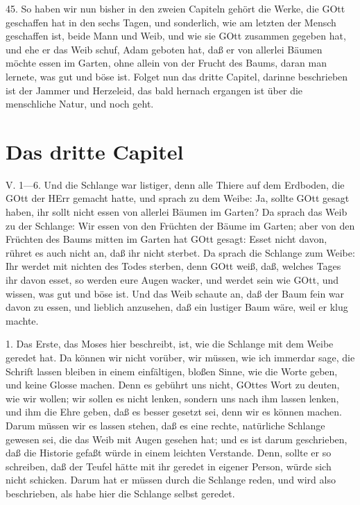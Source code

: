 45. So haben wir nun bisher in den zweien Capiteln gehört die Werke, die GOtt geschaffen hat in den sechs Tagen, und sonderlich, wie am letzten der Mensch geschaffen ist, beide Mann und Weib, und wie sie GOtt zusammen gegeben hat, und ehe er das Weib schuf, Adam geboten hat, daß er von allerlei Bäumen möchte essen im Garten, ohne allein von der Frucht des Baums, daran man lernete, was gut und böse ist. Folget nun das dritte Capitel, darinne beschrieben ist der Jammer und Herzeleid, das bald hernach ergangen ist über die menschliche Natur, und noch geht.

\section{Das dritte Capitel}

\begin{schriftzitat}
V. 1—6. Und die Schlange war listiger, denn alle Thiere auf dem Erdboden, die GOtt der HErr gemacht hatte, und sprach zu dem Weibe: Ja, sollte GOtt gesagt haben, ihr sollt nicht essen von allerlei Bäumen im Garten? Da sprach das Weib zu der Schlange: Wir essen von den Früchten der Bäume im Garten; aber von den Früchten des Baums mitten im Garten hat GOtt gesagt: Esset nicht davon, rühret es auch nicht an, daß ihr nicht sterbet. Da sprach die Schlange zum Weibe: Ihr werdet mit nichten des Todes sterben, denn GOtt weiß, daß, welches Tages
ihr davon esset, so werden eure Augen wacker, und werdet sein wie GOtt, und wissen, was gut und böse ist. Und das Weib schaute an, daß der Baum fein war davon zu essen, und lieblich anzusehen, daß ein lustiger Baum wäre, weil er klug machte.
\end{schriftzitat}

1. Das Erste, das Moses hier beschreibt, ist, wie die Schlange mit dem Weibe geredet hat. Da können wir nicht vorüber, wir müssen, wie ich immerdar sage, die Schrift lassen bleiben in einem einfältigen, bloßen Sinne, wie die Worte geben, und keine Glosse machen. Denn es gebührt uns nicht, GOttes Wort zu deuten, wie wir wollen; wir sollen es nicht lenken, sondern uns nach ihm lassen lenken, und ihm die Ehre geben, daß es besser gesetzt sei, denn wir es können machen. Darum müssen wir es lassen stehen, daß es eine rechte, natürliche Schlange gewesen sei, die das Weib mit Augen gesehen hat; und es ist darum geschrieben, daß die Historie gefaßt würde in einem leichten Verstande. Denn, sollte er so schreiben, daß der Teufel hätte mit ihr geredet in eigener Person, würde sich nicht schicken. Darum hat er müssen durch die Schlange reden, und wird also beschrieben, als habe hier die Schlange selbst geredet.

